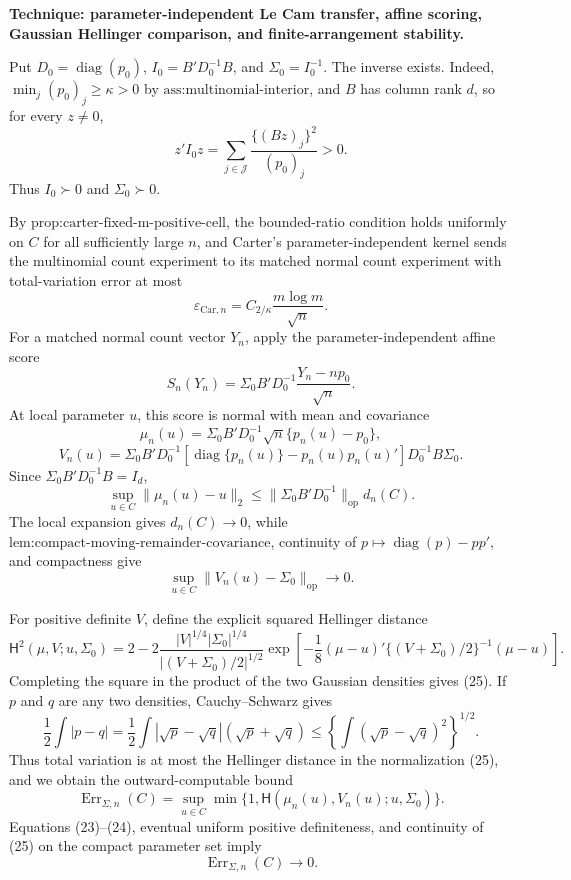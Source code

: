 \textbf{Technique: parameter-independent Le Cam transfer, affine scoring, Gaussian Hellinger comparison, and finite-arrangement stability.}

Put \(D_0=\operatorname{diag}(p_0)\), \(I_0=B'D_0^{-1}B\), and \(\Sigma_0=I_0^{-1}\).  The inverse exists.  Indeed, \(\min_j(p_0)_j\ge\kappa>0\) by \(\text{ass:multinomial-interior}\), and \(B\) has column rank \(d\), so for every \(z\ne0\),
\[
 z'I_0z=\sum_{j\in\mathcal J}\frac{\{(Bz)_j\}^2}{(p_0)_j}>0.
 \tag{18}
\]
Thus \(I_0\succ0\) and \(\Sigma_0\succ0\).

By \(\text{prop:carter-fixed-m-positive-cell}\), the bounded-ratio condition holds uniformly on \(C\) for all sufficiently large \(n\), and Carter's parameter-independent kernel sends the multinomial count experiment to its matched normal count experiment with total-variation error at most
\[
 \varepsilon_{\mathrm{Car},n}
 =C_{2/\kappa}\frac{m\log m}{\sqrt n}.
 \tag{19}
\]
For a matched normal count vector \(Y_n\), apply the parameter-independent affine score
\[
 S_n(Y_n)=\Sigma_0B'D_0^{-1}\frac{Y_n-np_0}{\sqrt n}.
 \tag{20}
\]
At local parameter \(u\), this score is normal with mean and covariance
\[
 \mu_n(u)=\Sigma_0B'D_0^{-1}\sqrt n\{p_n(u)-p_0\},
 \tag{21}
\]
\[
 V_n(u)=\Sigma_0B'D_0^{-1}
 [\operatorname{diag}\{p_n(u)\}-p_n(u)p_n(u)']
 D_0^{-1}B\Sigma_0.
 \tag{22}
\]
Since \(\Sigma_0B'D_0^{-1}B=I_d\),
\[
 \sup_{u\in C}\|\mu_n(u)-u\|_2
 \le \|\Sigma_0B'D_0^{-1}\|_{\mathrm{op}}d_n(C).
 \tag{23}
\]
The local expansion gives \(d_n(C)\to0\), while \(\text{lem:compact-moving-remainder-covariance}\), continuity of \(p\mapsto\operatorname{diag}(p)-pp'\), and compactness give
\[
 \sup_{u\in C}\|V_n(u)-\Sigma_0\|_{\mathrm{op}}\longrightarrow0.
 \tag{24}
\]

For positive definite \(V\), define the explicit squared Hellinger distance
\[
 \mathsf H^2(\mu,V;u,\Sigma_0)
 =2-2\frac{|V|^{1/4}|\Sigma_0|^{1/4}}
 {|(V+\Sigma_0)/2|^{1/2}}
 \exp\!\left[-\frac18(\mu-u)'
 \{(V+\Sigma_0)/2\}^{-1}(\mu-u)\right].
 \tag{25}
\]
Completing the square in the product of the two Gaussian densities gives (25).  If \(p\) and \(q\) are any two densities, Cauchy--Schwarz gives
\[
 \frac12\int|p-q|
 =\frac12\int|\sqrt p-\sqrt q|(\sqrt p+\sqrt q)
 \le\left\{\int(\sqrt p-\sqrt q)^2\right\}^{1/2}.
\]
Thus total variation is at most the Hellinger distance in the normalization (25), and we obtain the outward-computable bound
\[
 \operatorname{Err}_{\Sigma,n}(C)
 =\sup_{u\in C}\min\{1,
 \mathsf H(\mu_n(u),V_n(u);u,\Sigma_0)\}.
 \tag{26}
\]
Equations (23)--(24), eventual uniform positive definiteness, and continuity of (25) on the compact parameter set imply
\[
 \operatorname{Err}_{\Sigma,n}(C)\longrightarrow0.
 \tag{27}
\]

